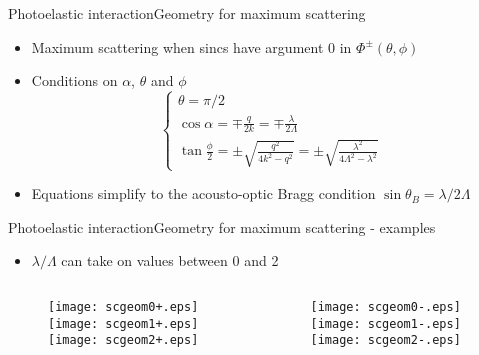 \documentclass[11pt]{beamer}
\begin{document}
	\begin{frame}{Photoelastic interaction}{Geometry for maximum scattering}
		\pause
		\begin{itemize}
			\item Maximum scattering when sincs have argument 0 in $\Phi^\pm(\theta,\phi)$ \pause
			\item Conditions on $\alpha$, $\theta$ and $\phi$
			\begin{equation*}
				\begin{cases}
					\theta = \pi/2 \\
					\cos{\alpha} = \mp \frac{q}{2k} = \mp \frac{\lambda}{2\Lambda} \\
					\tan{\frac{\phi}{2}} = \pm \sqrt{\frac{q^2}{4k^2-q^2}} = \pm \sqrt{\frac{\lambda^2}{4\Lambda^2-\lambda^2}}
				\end{cases}
			\end{equation*} \pause
			\item Equations simplify to the acousto-optic Bragg condition $\sin{\theta_B} = \lambda/2\Lambda$
		\end{itemize}
	\end{frame}
	
	\begin{frame}{Photoelastic interaction}{Geometry for maximum scattering - examples}
		\begin{itemize}
			\item $\lambda/\Lambda$ can take on values between 0 and 2
		\end{itemize}
		\begin{columns}
			\begin{column}{0.5\textwidth}
				\begin{figure}
					\centering
					\begin{overprint}
						\texttt{[image: scgeom0+.eps]}
						\onslide<2>\texttt{[image: scgeom1+.eps]}
						\onslide<3>\texttt{[image: scgeom2+.eps]}
					\end{overprint}
				\end{figure}
			\end{column}
			\begin{column}{0.5\textwidth}
				\begin{figure}
					\centering
					\begin{overprint}
						\texttt{[image: scgeom0-.eps]}
						\onslide<2>\texttt{[image: scgeom1-.eps]}
						\onslide<3>\texttt{[image: scgeom2-.eps]}
					\end{overprint}
				\end{figure}
			\end{column}
		\end{columns}
	\end{frame}
	
\end{document}
